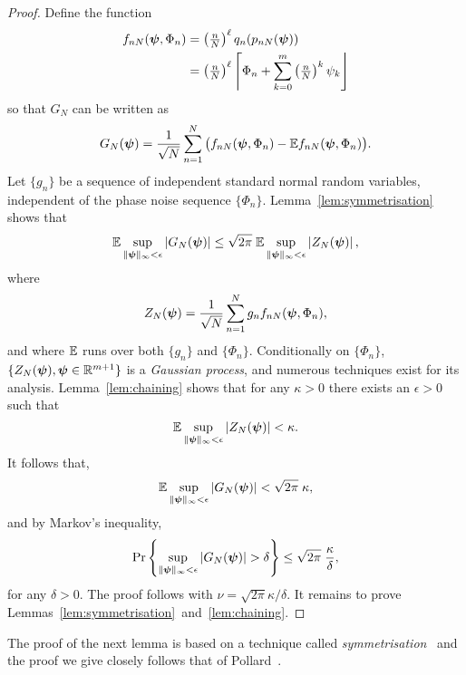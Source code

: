 \documentclass[journal]{IEEEtran}
\begin{document}
\begin{proof}
Define the function 
\begin{align*}
f_{nN}(\boldsymbol{\psi}, \Phi_n) &= \left( \tfrac{n}{N}\right)^\ell q_n(p_{nN}(\boldsymbol{\psi})) \\
&= \left( \tfrac{n}{N}\right)^\ell {\left\lceil \Phi_n + \sum_{k=0}^m\left( \tfrac{n}{N}\right)^k\psi_k \right\rfloor}
\end{align*}
so that $G_N$ can be written as
\[
G_N(\boldsymbol{\psi}) = \frac{1}{\sqrt{N}} \sum_{n=1}^{N} \big( f_{nN}(\boldsymbol{\psi}, \Phi_n) - {\mathbb E} f_{nN}(\boldsymbol{\psi}, \Phi_n) \big).
\]
Let $\{g_n\}$ be a sequence of independent standard normal random variables, independent of the phase noise sequence $\{\Phi_n\}$.  Lemma~\ref{lem:symmetrisation} shows that
\[
{\mathbb E} \sup_{\|\boldsymbol{\psi}\|_{\infty} < \epsilon} \left\vert  G_N(\boldsymbol{\psi}) \right\vert \leq \sqrt{2\pi} \; {\mathbb E} \sup_{\|\boldsymbol{\psi}\|_{\infty} < \epsilon}  \left\vert  Z_N(\boldsymbol{\psi})  \right\vert,
\]
where 
\begin{equation}\label{eq:ZpsiCondGaussProc}
Z_N(\psibf) = \frac{1}{\sqrt{N}} \sum_{n=1}^{N} g_n f_{nN}(\psibf, \Phi_n),
\end{equation}
and where ${\mathbb E}$ runs over both $\{g_n\}$ and $\{\Phi_n\}$.  Conditionally on $\{\Phi_n\}$, $\{Z_N(\boldsymbol{\psi}), \boldsymbol{\psi} \in {\mathbb R}^{m+1} \}$ is a \emph{Gaussian process}, and numerous techniques exist for its analysis.  Lemma~\ref{lem:chaining} shows that for any $\kappa > 0$ there exists an $\epsilon > 0$ such that
\[
{\mathbb E} \sup_{\|\boldsymbol{\psi}\|_{\infty} < \epsilon} \left\vert  Z_N(\boldsymbol{\psi})  \right\vert < \kappa.
\]
It follows that,
\[
{\mathbb E} \sup_{\|\boldsymbol{\psi}\|_{\infty} < \epsilon} \left\vert  G_N(\boldsymbol{\psi}) \right\vert  <  \sqrt{2\pi} \; \kappa,
\]
and by Markov's inequality,
\[
\operatorname{Pr} {\left\{   \sup_{\|\boldsymbol{\psi}\|_{\infty} < \epsilon} \left\vert  G_N(\boldsymbol{\psi}) \right\vert > \delta  \right\}} \leq  \sqrt{2\pi} \; \frac{\kappa}{\delta},
\]
for any $\delta > 0$.  The proof follows with $\nu =  \sqrt{2\pi} \kappa/\delta$.  It remains to prove Lemmas~\ref{lem:symmetrisation}~and~\ref{lem:chaining}.

\end{proof}

The proof of the next lemma is based on a technique called \emph{symmetrisation}~\cite{Gine_Zinn_symmetrisation_1984,van2009empirical} and the proof we give closely follows that of Pollard~\cite[Section 4]{Pollard_asymp_empi_proc_1989}.
\end{document}
